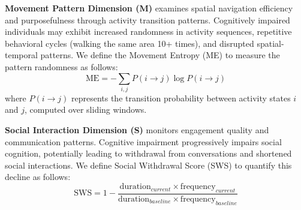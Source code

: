 \documentclass[sigconf, anonymous, 9pt, nonacm]{acmart}
\begin{document}

\noindent\textbf{Movement Pattern Dimension (M)} examines spatial navigation efficiency and purposefulness through activity transition patterns. Cognitively impaired individuals may exhibit increased randomness in activity sequences, repetitive behavioral cycles (walking the same area 10+ times), and disrupted spatial-temporal patterns.
We define the Movement Entropy (ME) to measure the pattern randomness as follows:
\begin{equation*}
\text{ME} = -\sum_{i,j} P(i \rightarrow j) \log P(i \rightarrow j)
\end{equation*}
where $P(i \rightarrow j)$ represents the transition probability between activity states $i$ and $j$, computed over sliding windows.

\noindent\textbf{Social Interaction Dimension (S)} monitors engagement quality and communication patterns. Cognitive impairment progressively impairs social cognition, potentially leading to withdrawal from conversations and shortened social interactions.
We define Social Withdrawal Score (SWS) to quantify this decline as follows:
\begin{equation*}
\text{SWS} = 1 - \frac{\text{duration}_{current} \times \text{frequency}_{current}}{\text{duration}_{baseline} \times \text{frequency}_{baseline}}
\end{equation*}
\end{document}
